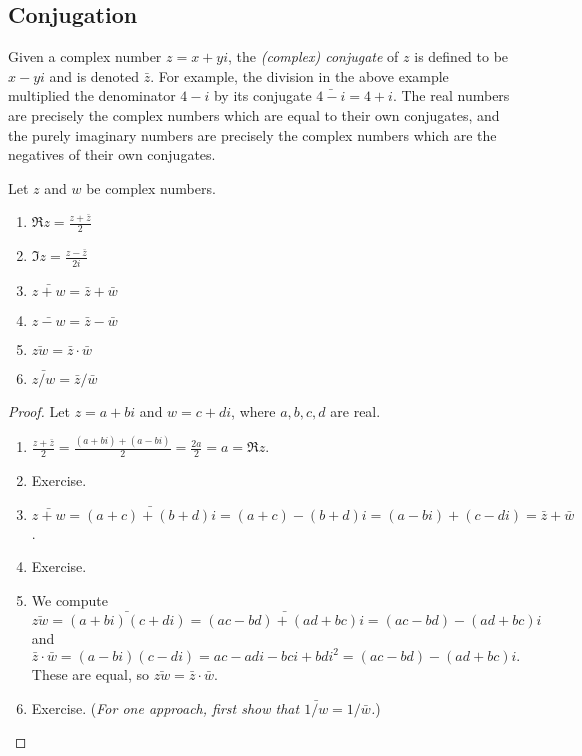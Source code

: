 \subsection{Conjugation}

Given a complex number $z = x + yi$, the \emph{(complex) conjugate} of $z$ is defined to be $x - yi$ and is denoted $\bar{z}$. For example, the division in the above example multiplied the denominator $4 - i$ by its conjugate $\bar{4 - i} = 4 + i$. The real numbers are precisely the complex numbers which are equal to their own conjugates, and the purely imaginary numbers are precisely the complex numbers which are the negatives of their own conjugates.

\begin{proposition}
Let $z$ and $w$ be complex numbers.
\begin{enumerate}
\item $\Re z = \frac{z + \bar{z}}{2}$
\item $\Im z = \frac{z - \bar{z}}{2i}$
\item $\bar{z + w} = \bar{z} + \bar{w}$
\item $\bar{z - w} = \bar{z} - \bar{w}$
\item $\bar{zw} = \bar{z}\cdot\bar{w}$
\item $\bar{z/w} = \bar{z}/\bar{w}$
\end{enumerate}
\end{proposition}
\begin{proof}
Let $z = a + bi$ and $w = c + di$, where $a,b,c,d$ are real.
\begin{enumerate}
\item $\frac{z + \bar{z}}{2} = \frac{(a + bi) + (a - bi)}{2} = \frac{2a}{2} = a = \Re z$.
\item Exercise.
\item $\bar{z + w} = \bar{(a + c) + (b + d)i} = (a + c) - (b + d)i = (a - bi) + (c - di) = \bar{z} + \bar{w}$.
\item Exercise.
\item We compute
\begin{equation}
\bar{zw} = \bar{(a + bi)(c + di)} = \bar{(ac - bd) + (ad + bc)i} = (ac - bd) - (ad + bc)i
\end{equation}
and
\begin{equation}
\bar{z}\cdot\bar{w} = (a - bi)(c - di) = ac - adi - bci + bdi^2 = (ac - bd) - (ad + bc)i.
\end{equation}
These are equal, so $\bar{zw} = \bar{z}\cdot\bar{w}$.
\item Exercise. (\textit{For one approach, first show that $\bar{1/w} = 1/\bar{w}$.})
\end{enumerate}
\end{proof}

